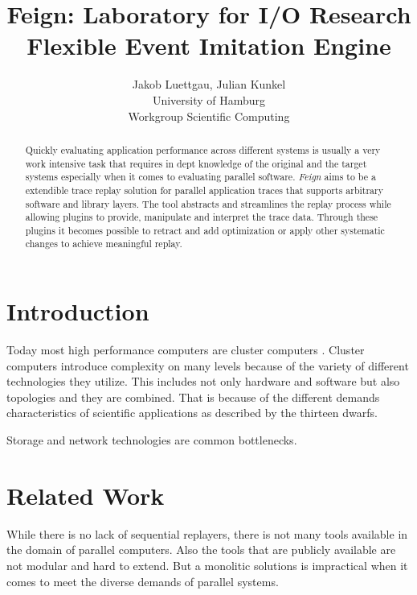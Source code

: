 \documentclass[]{article}
\title{
	\textbf{Feign: Laboratory for I/O Research}\\
	Flexible Event Imitation Engine
} %
\author{
	\small{
		{Jakob Luettgau},
		{Julian Kunkel}
	}\\
	\footnotesize{University of Hamburg} \\
	\footnotesize{Workgroup Scientific Computing} \\
}
\date{}
\begin{document}
\maketitle
\begin{abstract}
Quickly evaluating application performance across different systems is usually
a very work intensive task that requires in dept knowledge of the original and
the target systems especially when it comes to evaluating parallel software.
\emph{Feign} aims to be a extendible trace replay solution for parallel
application traces that supports arbitrary software and library layers. The
tool abstracts and streamlines the replay process while allowing plugins to
provide, manipulate and interpret the trace data.  Through these plugins it
becomes possible to retract and add optimization or apply other systematic
changes to achieve meaningful replay.
\end{abstract}
\section{Introduction}
\label{sec:introduction}

Today most high performance computers are cluster computers \cite{Top500}.
Cluster computers introduce complexity on many levels because of the variety of
different technologies they utilize. This includes not only hardware and
software but also topologies and they are combined. That is because of the
different demands characteristics of scientific applications as described by
the thirteen dwarfs\cite{Asanovic2006}.

Storage and network technologies are common bottlenecks.


\section{Related Work}
\label{sec:related}

While there is no lack of sequential replayers, there is not many tools available
in the domain of parallel computers. Also the tools that are publicly available
are not modular and hard to extend. But a monolitic solutions is impractical
when it comes to meet the diverse demands of parallel systems.
\end{document}

